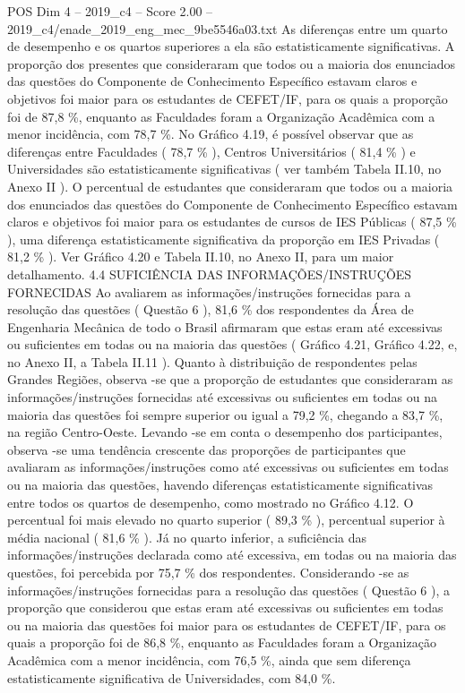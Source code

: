 \begin{textsample}{POS Dim 4 – 2019\_c4 – Score 2.00 – 2019\_c4/enade\_2019\_eng\_mec\_9be5546a03.txt}
As diferenças entre um quarto de desempenho e os quartos superiores a ela são estatisticamente significativas.
A proporção dos presentes que consideraram que todos ou a maioria dos enunciados das questões do Componente de Conhecimento Específico estavam claros e objetivos foi maior para os estudantes de CEFET/IF, para os quais a proporção foi de 87,8 \%, enquanto as Faculdades foram a Organização Acadêmica com a menor incidência, com 78,7 \%.
No Gráfico 4.19, é possível observar que as diferenças entre Faculdades ( 78,7 \% ), Centros Universitários ( 81,4 \% ) e Universidades são estatisticamente significativas ( ver também Tabela II.10, no Anexo II ).
O percentual de estudantes que consideraram que todos ou a maioria dos enunciados das questões do Componente de Conhecimento Específico estavam claros e objetivos foi maior para os estudantes de cursos de IES Públicas ( 87,5 \% ), uma diferença estatisticamente significativa da proporção em IES Privadas ( 81,2 \% ).
Ver Gráfico 4.20 e Tabela II.10, no Anexo II, para um maior detalhamento. 4.4 SUFICIÊNCIA DAS INFORMAÇÕES/INSTRUÇÕES FORNECIDAS Ao avaliarem as informações/instruções fornecidas para a resolução das questões ( Questão 6 ), 81,6 \% dos respondentes da Área de Engenharia Mecânica de todo o Brasil afirmaram que estas eram até excessivas ou suficientes em todas ou na maioria das questões ( Gráfico 4.21, Gráfico 4.22, e, no Anexo II, a Tabela II.11 ).
Quanto à distribuição de respondentes pelas Grandes Regiões, observa -se que a proporção de estudantes que consideraram as informações/instruções fornecidas até excessivas ou suficientes em todas ou na maioria das questões foi sempre superior ou igual a 79,2 \%, chegando a 83,7 \%, na região Centro-Oeste.
Levando -se em conta o desempenho dos participantes, observa -se uma tendência crescente das proporções de participantes que avaliaram as informações/instruções como até excessivas ou suficientes em todas ou na maioria das questões, havendo diferenças estatisticamente significativas entre todos os quartos de desempenho, como mostrado no Gráfico 4.12.
O percentual foi mais elevado no quarto superior ( 89,3 \% ), percentual superior à média nacional ( 81,6 \% ).
Já no quarto inferior, a suficiência das informações/instruções declarada como até excessiva, em todas ou na maioria das questões, foi percebida por 75,7 \% dos respondentes.
Considerando -se as informações/instruções fornecidas para a resolução das questões ( Questão 6 ), a proporção que considerou que estas eram até excessivas ou suficientes em todas ou na maioria das questões foi maior para os estudantes de CEFET/IF, para os quais a proporção foi de 86,8 \%, enquanto as Faculdades foram a Organização Acadêmica com a menor incidência, com 76,5 \%, ainda que sem diferença estatisticamente significativa de Universidades, com 84,0 \%.

\end{textsample}
